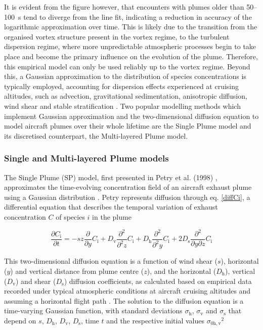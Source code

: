 It is evident from the figure however, that encounters with plumes older than 50--100~s tend to diverge from the line fit, indicating a reduction in accuracy of the logarithmic approximation over time. This is likely due to the transition from the organised vortex structure present in the vortex regime, to the turbulent dispersion regime, where more unpredictable atmospheric processes begin to take place and become the primary influence on the evolution of the plume. Therefore, this empirical model can only be used reliably up to the vortex regime. Beyond this, a Gaussian approximation to the distribution of species concentrations is typically employed, accounting for dispersion effects experienced at cruising altitudes, such as advection, gravitational sedimentation, anisotropic diffusion, wind shear and stable stratification \cite{Konopka1995}. Two popular modelling methods which implement Gaussian approximation and the two-dimensional diffusion equation to model aircraft plumes over their whole lifetime are the Single Plume model and its discretised counterpart, the Multi-layered Plume model.

\subsubsection{Single and Multi-layered Plume models}
The Single Plume (SP) model, first presented in Petry et al. (1998) \cite{Petry1998}, approximates the time-evolving concentration field of an aircraft exhaust plume using a Gaussian distribution \cite{Vohralik2008}. Petry represents diffusion through eq. \eqref{diffCi}, a differential equation that describes the temporal variation of exhaust concentration $C$ of species $i$ in the plume

\begin{equation}
	\frac{\partial C_{\mathrm{i}}}{\partial t} = -sz \frac{\partial}{\partial y} C_{\mathrm{i}} + D_{\mathrm{v}} \frac{\partial^2}{\partial^2 z} C_{\mathrm{i}} + D_{\mathrm{h}} \frac{\partial^2}{\partial^2 y} C_{\mathrm{i}} + 2D_{\mathrm{s}} \frac{\partial^2}{\partial y \partial z} C_{\mathrm{i}}
	\label{diffCi}
\end{equation}

This two-dimensional diffusion equation is a function of wind shear ($s$), horizontal ($y$) and vertical distance from plume centre ($z$), and the horizontal ($D_{\mathrm{h}}$), vertical ($D_{\mathrm{v}}$) and shear ($D_{\mathrm{s}}$) diffusion coefficients, as calculated based on empirical data recorded under typical atmospheric conditions at aircraft cruising altitudes and assuming a horizontal flight path \cite{Durbeck1995}. The solution to the diffusion equation is a time-varying Gaussian function, with standard deviations $\sigma_{\mathrm{h}}$, $\sigma_{\mathrm{v}}$ and $\sigma_{\mathrm{s}}$ that depend on $s$, $D_{\mathrm{h}}$, $D_{\mathrm{v}}$, $D_{\mathrm{s}}$, time $t$ and the respective initial values ${\sigma_{\mathrm{0h, v}}}^2$


